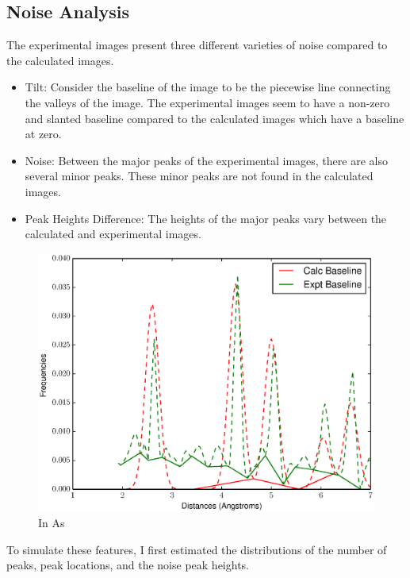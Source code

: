 \documentclass[12pt,letterpaper]{article}
\begin{document}
\clearpage

\subsection{Noise Analysis}
The experimental images present three different varieties of noise compared to
the calculated images.

\begin{itemize}
  \item{Tilt: Consider the baseline of the image to be the piecewise line
      connecting the valleys of the image. The experimental images seem to have a
      non-zero and slanted baseline compared to the calculated images which 
      have a baseline at zero.} 
  \item{Noise: Between the major peaks of the experimental images, there are
      also several minor peaks. These minor peaks are not found in the calculated
      images.}
  \item{Peak Heights Difference: The heights of the major peaks vary between the
      calculated and experimental images.}
\end{itemize}

\begin{figure}[ht]
  \begin{center}
    \includegraphics[scale=0.7]{figs/inas_valleys.eps}
    \caption{In As}
  \end{center}
\end{figure}

To simulate these features, I first estimated the distributions of the number of
peaks, peak locations, and the noise peak heights. 
\end{document}
